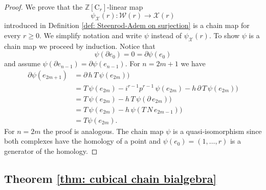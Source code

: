 \documentclass[A4]{amsart}
\theoremstyle{definition}
\newcommand{\Z}{\mathbb{Z}}
\begin{document}
\begin{proof}
	We prove that the $\Z[\mathrm{C}_r]$-linear map
	\begin{equation*}
	\psi_{\mathcal X}(r) : \mathcal W(r) \to \mathcal X(r)
	\end{equation*}
	introduced in Definition \ref{def: Steenrod-Adem on surjection} is a chain map for every $r \geq 0$. We simplify notation and write $\psi$ instead of $\psi_{\mathcal X}(r)$. To show $\psi$ is a chain map we proceed by induction. Notice that
	\begin{equation*}
	\psi(\partial e_0) = 0 = \partial \psi(e_0)
	\end{equation*}
	and assume $\psi(\partial e_{n-1}) = \partial \psi(e_{n-1})$. For $n = 2m+1$ we have
	\begin{align*}
	\partial \psi(e_{2m+1}) 
	& =
	\partial\, h\, T\, \psi(e_{2m}) \big) \\
	& =
	T\, \psi(e_{2m}) - i^{r-1} p^{r-1}\, \psi(e_{2m}) -
	h\, \partial\, T\, \psi(e_{2m}) \big) \\
	& =
	T\, \psi(e_{2m}) - 
	h\, T\, \psi(\partial\, e_{2m}) \big) \\
	& =
	T\, \psi(e_{2m}) - 
	h\, \psi(T\,N\, e_{2m-1}) \big) \\
	& = 
	T \psi(e_{2m}).
	\end{align*}
	For $n = 2m$ the proof is analogous. The chain map $\psi$ is a quasi-isomorphism since both complexes have the homology of a point and $\psi(e_0) = (1, \dots, r)$ is a generator of the homology.
\end{proof}

\subsection{Theorem \ref{thm: cubical chain bialgebra}}
\end{document}
